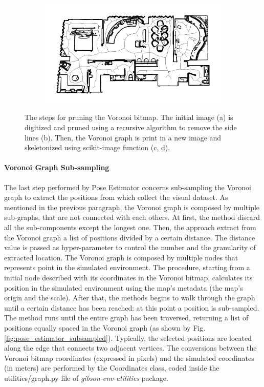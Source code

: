 \begin{figure}[h!]
\begin{subfigure}[b]{0.49\linewidth}
		\caption{}
		\label{fig:pose_estimator_skelethon}
	\end{subfigure}
	\hfil
	\begin{subfigure}[b]{0.49\linewidth}
		\centering
		\includegraphics[width=\textwidth]{images/pose_estimator_skelethon_map.png}
		\caption{}
		\label{fig:pose_estimator_skelethon_map}
	\end{subfigure}
	\caption{The steps for pruning the Voronoi bitmap. The initial image (a) is digitized and pruned using a recursive algorithm to remove the side lines (b). Then, the Voronoi graph is print in a new image and skeletonized using scikit-image function (c, d). }
\end{figure}

\paragraph{Voronoi Graph Sub-sampling} The last step performed by Pose Estimator concerns sub-sampling the Voronoi graph to extract the positions from which collect the visual dataset. As mentioned in the previous paragraph, the Voronoi graph is composed by multiple sub-graphs, that are not connected with each others. At first, the method discard all the sub-components except the longest one. Then, the approach extract from the Voronoi graph a list of positions divided by a certain distance. The distance value is passed as hyper-parameter to control the number and the granularity of extracted location. The Voronoi graph is composed by multiple nodes that represents point in the simulated environment. The procedure, starting from a initial node described with its coordinates in the Voronoi bitmap, calculates its position in the simulated environment using the map's metadata (the map's origin and the scale). After that, the methods begins to walk through the graph until a certain distance has been reached: at this point a position is sub-sampled. The method runs until the entire graph has been traversed, returning a list of positions equally spaced in the Voronoi graph (as shown by Fig. \ref{fig:pose_estimator_subsampled}). Typically, the selected positions are located along the edge that connects two adjacent vertices. The conversions between the Voronoi bitmap coordinates (expressed in pixels) and the simulated coordinates (in meters) are performed by the \textsf{Coordinates} class, coded inside the \textsf{utilities/graph.py} file of \textit{gibson-env-utilities} package.

